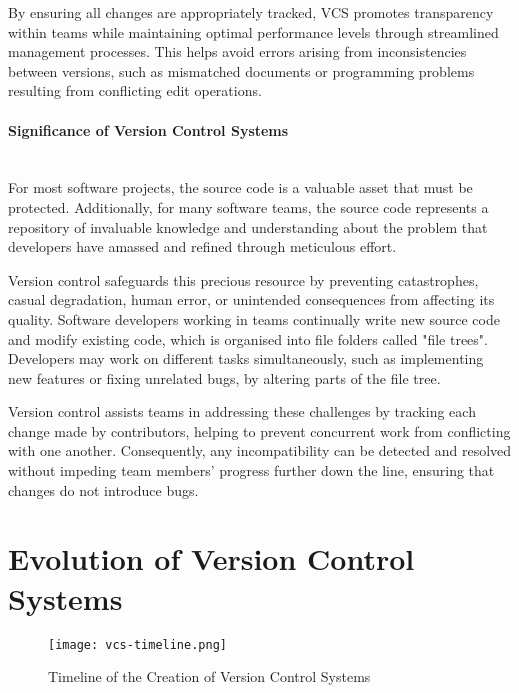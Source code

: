 By ensuring all changes are appropriately tracked, VCS promotes transparency within teams while maintaining optimal performance levels through streamlined management processes. This helps avoid errors arising from inconsistencies between versions, such as mismatched documents or programming problems resulting from conflicting edit operations.

\paragraph{Significance of Version Control Systems}
\hfill\medskip\\
For most software projects, the source code is a valuable asset that must be protected. Additionally, for many software teams, the source code represents a repository of invaluable knowledge and understanding about the problem that developers have amassed and refined through meticulous effort.

Version control safeguards this precious resource by preventing catastrophes, casual degradation, human error, or unintended consequences from affecting its quality. Software developers working in teams continually write new source code and modify existing code, which is organised into file folders called "file trees". Developers may work on different tasks simultaneously, such as implementing new features or fixing unrelated bugs, by altering parts of the file tree.

Version control assists teams in addressing these challenges by tracking each change made by contributors, helping to prevent concurrent work from conflicting with one another. Consequently, any incompatibility can be detected and resolved without impeding team members' progress further down the line, ensuring that changes do not introduce bugs.

\section{Evolution of Version Control Systems}
\begin{figure}[htbp]
    \centering
    \texttt{[image: vcs-timeline.png]}
    \caption{Timeline of the Creation of Version Control Systems \cite{stopak_2019}}
    \label{fig:vcs-timeline}
\end{figure}
